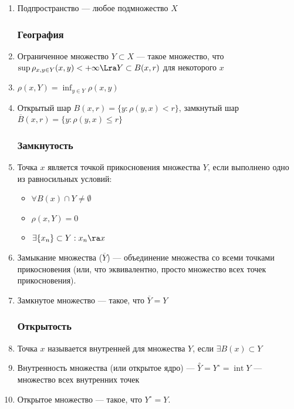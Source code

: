 \begin{enumerate}
    \item Подпространство --- любое подмножество \(X\)
    
\subsubsection{География}
    \item Ограниченное множество \(Y \subset X\) --- такое множество, что \(\sup \rho_{x, y \in Y}(x, y) < +\infty \Lra Y \subset B(x, r)\) для некоторого \(x\)
    \item \(\rho(x, Y) = \inf_{y \in Y} \rho(x, y)\)
    \item Открытый шар \(B(x, r) = \{y: \rho(y, x) < r\}\), замкнутый шар \(\overline{B}(x, r) = \{y: \rho(y, x) \le r\}\)

\subsubsection{Замкнутость}
    \item Точка \(x\) является точкой прикосновения множества \(Y\), если выполнено одно из равносильных условий:
    \begin{itemize}
        \item \(\forall B(x) \cap Y \ne \emptyset\)
        \item \(\rho(x, Y) = 0\)
        \item \(\exists \{x_n\} \subset Y: x_n \ra x\) 
    \end{itemize}
    \item Замыкание множества (\(\overline{Y}\)) --- объединение множества со всеми точками прикосновения (или, что эквивалентно, просто множество всех точек прикосновения).
    \item Замкнутое множество --- такое, что \(\overline{Y} = Y\)
    
\subsubsection{Открытость}
    \item Точка \(x\) называется внутренней для множества \(Y\), если \(\exists B(x) \subset Y\)
    \item Внутренность множества (или открытое ядро) --- \(\stackrel{\circ}{Y} = Y^{\circ} = \operatorname{int}Y\) --- множество всех внутренних точек
    \item Открытое множество --- такое, что \(Y^{\circ} = Y\).



\end{enumerate}
